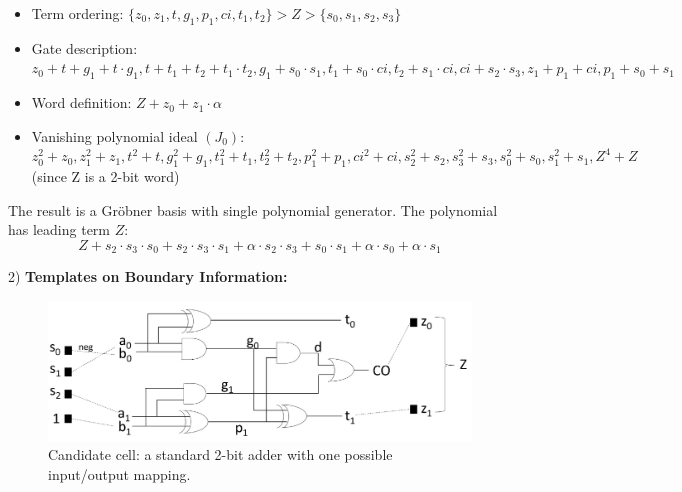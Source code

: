 \begin{itemize}
\item Term ordering: $\{z_0,z_1,t,g_1,p_1,ci,t_1,t_2\}>Z>\{s_0,s_1,s_2,s_3\}$
\item Gate description: $z_0+t+g_1+t\cdot g_1, t+t_1+t_2+t_1\cdot t_2, g_1+s_0\cdot s_1,
			t_1+s_0\cdot ci, t_2+s_1\cdot ci, ci+s_2\cdot s_3, z_1+p_1+ci, p_1+s_0+s_1$
\item Word definition: $Z+z_0+z_1\cdot \alpha$
\item Vanishing polynomial ideal $(J_0)$: $z_0^2+z_0, z_1^2+z_1, t^2+t, g_1^2+g_1, t_1^2+t_1, t_2^2+t_2, p_1^2+p_1, ci^2+ci,
			s_2^2+s_2, s_3^2+s_3, s_0^2+s_0, s_1^2+s_1, Z^4+Z$ (since Z is a 2-bit word)
\end{itemize}

The result is a Gr\"obner basis with single polynomial generator. The polynomial has leading term $Z$:
$$Z+s_2\cdot s_3\cdot s_0+s_2\cdot s_3\cdot s_1+\alpha\cdot s_2\cdot s_3+s_0\cdot s_1+\alpha\cdot s_0+\alpha\cdot s_1$$


2) {\bf Templates on Boundary Information:}
\begin{figure}[h]
	\begin{center}
	\includegraphics[width=\textwidth]{newfig/template.pdf}
	\end{center}
	\caption{Candidate cell: a standard 2-bit adder with one possible input/output mapping.}
	\label{fig:template}
\end{figure}

